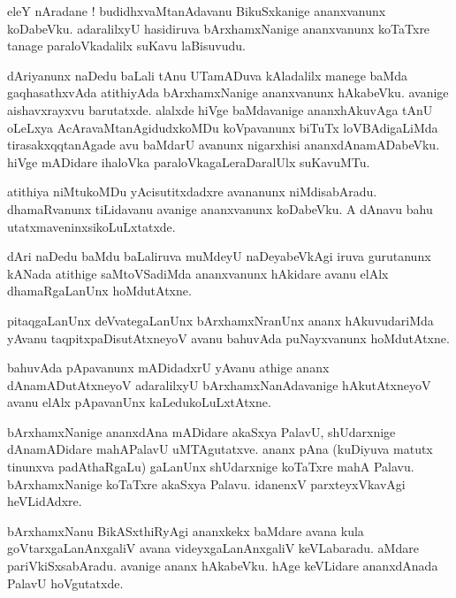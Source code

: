 \documentclass{article}
\begin{document}
\begin{mn}%
eleY nAradane ! budidhxvaMtanAdavanu BikuSxkanige ananxvanunx koDabeVku. adaralilxyU hasidiruva 
bArxhamxNanige ananxvanunx koTaTxre tanage paraloVkadalilx suKavu laBisuvudu.
\end{mn}

\begin{mn}%
dAriyanunx naDedu baLali tAnu UTamADuva kAladalilx manege baMda gaqhasathxvAda atithiyAda 
bArxhamxNanige ananxvanunx hAkabeVku. avanige aishavxrayxvu barutatxde. alalxde hiVge baMdavanige 
ananxhAkuvAga tAnU oLeLxya AcAravaMtanAgidudxkoMDu koVpavanunx biTuTx loVBAdigaLiMda 
tirasakxqqtanAgade avu baMdarU avanunx nigarxhisi ananxdAnamADabeVku. hiVge mADidare ihaloVka 
paraloVkagaLeraDaralUlx suKavuMTu.
\end{mn}

\begin{mn}%
atithiya niMtukoMDu yAcisutitxdadxre avananunx niMdisabAradu. dhamaRvanunx tiLidavanu avanige 
ananxvanunx koDabeVku. A dAnavu bahu utatxmaveninxsikoLuLxtatxde.
\end{mn}

\begin{mn}%
dAri naDedu baMdu baLaliruva muMdeyU naDeyabeVkAgi iruva gurutanunx kANada atithige saMtoVSadiMda 
ananxvanunx hAkidare avanu elAlx dhamaRgaLanUnx hoMdutAtxne.
\end{mn}

\begin{mn}%
pitaqgaLanUnx deVvategaLanUnx bArxhamxNranUnx ananx hAkuvudariMda yAvanu taqpitxpaDisutAtxneyoV 
avanu bahuvAda puNayxvanunx hoMdutAtxne.
\end{mn}

\begin{mn}%
bahuvAda pApavanunx mADidadxrU yAvanu athige ananx dAnamADutAtxneyoV adaralilxyU 
bArxhamxNanAdavanige hAkutAtxneyoV avanu elAlx pApavanUnx kaLedukoLuLxtAtxne.
\end{mn}

\begin{mn}%
bArxhamxNanige ananxdAna mADidare akaSxya PalavU, shUdarxnige dAnamADidare mahAPalavU uMTAgutatxve. 
ananx pAna (kuDiyuva matutx tinunxva padAthaRgaLu) gaLanUnx shUdarxnige koTaTxre mahA Palavu. 
bArxhamxNanige koTaTxre akaSxya Palavu. idanenxV parxteyxVkavAgi heVLidAdxre.
\end{mn}

\begin{mn}%
bArxhamxNanu BikASxthiRyAgi ananxkekx baMdare avana kula goVtarxgaLanAnxgaliV avana 
videyxgaLanAnxgaliV keVLabaradu. aMdare pariVkiSxsabAradu. avanige ananx hAkabeVku. hAge keVLidare 
ananxdAnada PalavU hoVgutatxde.
\end{mn}
\end{document}
